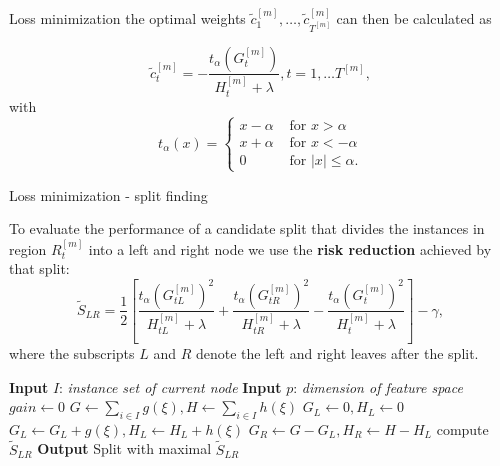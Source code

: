 \begin{vbframe}{Loss minimization}
the optimal weights $\tilde{c}^{[m]}_1,\dots, \tilde{c}^{[m]}_{T^{[m]}}$ can then be calculated as

\lz
$$
\tilde{c}^{[m]}_t = - \frac{t_\alpha\left(G^{[m]}_t\right)}{H^{[m]}_t + \lambda}, t=1,\dots T^{[m]},
$$
with $$t_\alpha(x) = \begin{cases}
  x - \alpha &\text{ for } x > \alpha \\
  x + \alpha &\text{ for } x < - \alpha \\
  0  &\text{ for } |x| \leq \alpha.
\end{cases}$$

\end{vbframe}

\begin{vbframe}{Loss minimization - split finding}

To evaluate the performance of a candidate split that divides the instances in region $R_t^{[m]}$ into a left and right node we use the \textbf{risk reduction} achieved by that split:
$$
\tilde S_{LR} =
 \frac12 \left[\frac{t_\alpha\left(G^{[m]}_{tL}\right)^2}{H^{[m]}_{tL} + \lambda} + \frac{t_\alpha\left(G^{[m]}_{tR}\right)^2}{H^{[m]}_{tR} + \lambda} - \frac{t_\alpha\left(G^{[m]}_{t}\right)^2}{H^{[m]}_{t} + \lambda}\right] - \gamma,
$$
where the subscripts $L$ and $R$ denote the left and right leaves after the split.


\lz

\framebreak

\begin{algorithm}[H]

\begin{footnotesize}
\begin{center}

  \begin{algorithmic}[1]
    \State \textbf{Input} $I$: \emph{instance set of current node}
    \State \textbf{Input} $p$: \emph{dimension of feature space}
    \State $gain \gets 0$
    \State $G \gets \sum_{i \in I} g(\xi), {H} \gets \sum_{i \in I} h(\xi)$
      \State $G_L \gets 0, {H}_L \gets 0$
        \State ${G}_L \gets {G}_L + g(\xi), {H}_L \gets {H}_L + h(\xi)$
        \State ${G}_R \gets G - {G}_L, {H}_R \gets {H} - {H}_L$
        \State compute $\tilde S_{LR}$
      \EndFor
    \EndFor
    \State \textbf{Output} Split with maximal $\tilde S_{LR}$
  \end{algorithmic}
\end{center}
\end{footnotesize}
\caption{(Exact) Algorithm for split finding}
\end{algorithm}

\end{vbframe}

